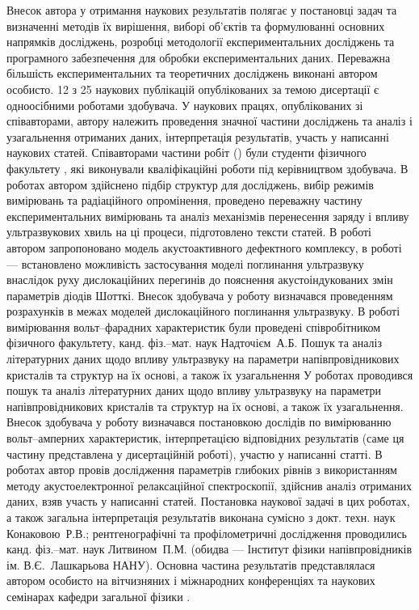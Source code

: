 {\contributionTXT}
Внесок автора у отримання наукових результатів полягає у постановці задач
та визначенні методів їх вирішення, виборі об'єктів та формулюванні
основних напрямків досліджень,
розробці методології експериментальних досліджень та програмного забезпечення для обробки експериментальних даних.
Переважна більшість експериментальних та теоретичних досліджень виконані автором особисто.
12 з 25 наукових публікацій опублікованих за темою дисертації є одноосібними роботами здобувача.
У наукових працях, опублікованих зі співавторами, автору належить проведення значної частини досліджень та аналіз і узагальнення отриманих
даних, інтерпретація результатів, участь у написанні наукових статей.
Співавторами частини робіт (\cite{Olikh2018JAP,Olikh:Ultras2016,Olikh2016JSem,OlikhJAP,Olikh:PZTF2006}) були студенти фізичного факультету \thesisOfOrganization,
які виконували кваліфікаційні роботи під керівництвом здобувача.
В роботах \cite{Olikh2018JAP,Olikh:Ultras2016,Olikh2016JSem,OlikhJAP,Olikh:SEMT2007,Olikh:MRS2007,Olikh:PZTF2006} автором здійснено підбір структур для досліджень, вибір режимів вимірювань та радіаційного опромінення,
проведено переважну частину експериментальних вимірювань та аналіз механізмів перенесення заряду і впливу ультразвукових хвиль на ці процеси,
підготовлено тексти статей.
В роботі \cite{Olikh2018JAP} автором запропоновано модель акустоактивного дефектного комплексу,
в роботі \cite{Olikh:Ultras2016} --- встановлено можливість застосування моделі поглинання ультразвуку внаслідок руху дислокаційних перегинів до пояснення акустоіндукованих змін параметрів діодів Шотткі.
Внесок здобувача у роботу \cite{Olikh:UPJ2014} визначався проведенням розрахунків в межах моделей дислокаційного поглинання ультразвуку.
В роботі \cite{Olikh:UPJ2013} вимірювання вольт--фарадних характеристик були проведені співробітником фізичного факультету, канд. фіз.--мат. наук Надточієм~А.\:Б.
Пошук та аналіз літературних даних щодо впливу ультразвуку на параметри напівпровідникових кристалів та структур на їх основі, а також їх узагальнення
У роботах \cite{Olikh:SEMT2004,Olikh:SEMT2011} проводився пошук та аналіз літературних даних щодо впливу ультразвуку на параметри напівпровідникових кристалів та структур на їх основі, а також їх узагальнення.
Внесок здобувача у роботу \cite{Gorb2010} визначався постановкою дослідів по вимірюванню вольт--амперних характеристик,
інтерпретацією відповідних результатів (саме ця частину представлена у дисертаційній роботі), участю у написанні статті.
В роботах \cite{Olikh:PhChOM2005,Olikh:PJE2004} автор провів дослідження параметрів глибоких рівнів з використанням методу акустоелектронної релаксаційної спектроскопії,
здійснив аналіз отриманих даних, взяв участь у написанні статей.
Постановка наукової задачі в цих роботах, а також загальна інтерпретація результатів виконана сумісно з докт. техн. наук Конаковою~Р.\:В.;
рентгенографічні та профілометричні дослідження проводились канд. фіз.--мат. наук Литвином~П.\:М.  (обидва --- Інститут фізики напівпровідників ім. В.\:Є.~Лашкарьова НАНУ).
Основна частина результатів
представлялася автором особисто на вітчизняних і міжнародних конференціях
та наукових семінарах кафедри загальної фізики \thesisOfOrganization.






